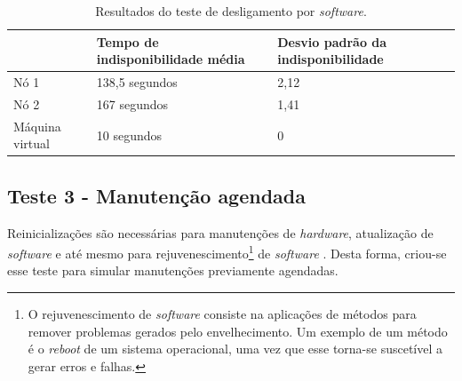 \begin{table}[h!]
\caption{Resultados do teste de desligamento por \textit{software}.}
\label{tab:teste2resultados}
\begin{center}
\begin{tabular}{|l|l|l|}\hline
 & \textbf{Tempo de indisponibilidade média} & \textbf{Desvio padrão da indisponibilidade} \\\hline
Nó 1 & 138,5 segundos & 2,12 \\\hline
Nó 2 & 167 segundos & 1,41 \\\hline
Máquina virtual & 10 segundos & 0 \\\hline
\end{tabular}
\end{center}
\end{table}


\subsection{Teste 3 - Manutenção agendada}

Reinicializações são necessárias para manutenções de \textit{hardware}, atualização de \textit{software} e até mesmo para 
rejuvenescimento\footnote{O rejuvenescimento de \textit{software} consiste na aplicações de métodos para remover problemas gerados pelo 
envelhecimento. Um exemplo de um método é o \textit{reboot} de um sistema operacional, uma vez que esse torna-se suscetível a gerar erros e 
falhas.} de \textit{software} \cite{melo2014}. Desta forma, criou-se esse teste para simular manutenções previamente agendadas.


